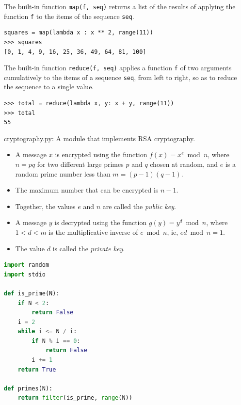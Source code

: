 \documentclass[8pt,a4paper,compress,handout]{beamer}
\begin{document}
\begin{frame}[fragile]
The built-in function \lstinline{map(f, seq)} returns a list of the results of applying the function \lstinline{f} to the items of the sequence \lstinline{seq}.
\begin{lstlisting}[language={}]
squares = map(lambda x : x ** 2, range(11))
>>> squares
[0, 1, 4, 9, 16, 25, 36, 49, 64, 81, 100]
\end{lstlisting}

\bigskip

The built-in function \lstinline{reduce(f, seq)} applies a function \lstinline{f} of two arguments cumulatively to the items of a sequence \lstinline{seq}, from left to right, so as to reduce the sequence to a single value.
\begin{lstlisting}[language={}]
>>> total = reduce(lambda x, y: x + y, range(11))
>>> total
55
\end{lstlisting}
\end{frame}

\begin{frame}[fragile]
\begin{framed}
\tiny cryptography.py: A module that implements RSA cryptography.
\begin{itemize}

\item A message $x$ is encrypted using the function $f(x) = x^e \bmod n$, where $n=pq$ for two different large primes $p$ and $q$ chosen at random, and $e$ is a random prime number less than $m=(p-1)(q-1)$. 

\item The maximum number that can be encrypted is $n-1$.

\item Together, the values $e$ and $n$ are called the \emph{public key}.

\item A message $y$ is decrypted using the function $g(y) = y^d \bmod n$, where $1 < d < m$ is the multiplicative inverse of $e \bmod n$, ie, $ed \bmod n = 1$.

\item The value $d$ is called the \emph{private key}.
\end{itemize}
\end{framed}
\begin{lstlisting}[language=Python]
import random
import stdio

def is_prime(N):
    if N < 2: 
        return False
    i = 2
    while i <= N / i:
        if N % i == 0:
            return False
        i += 1
    return True

def primes(N):
    return filter(is_prime, range(N))
\end{lstlisting}
\end{frame}
\end{document}
